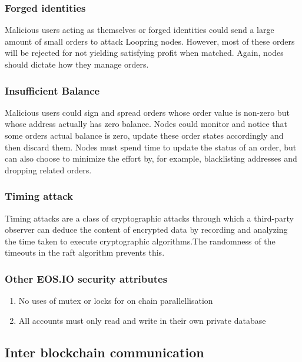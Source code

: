 \documentclass[]{article}
\begin{document}
		
		\subsubsection{Forged identities}
		Malicious users acting as themselves or forged identities 
		could send a large amount of small orders to attack Loopring
		nodes. However, most of these orders will be rejected 
		for not yielding satisfying profit when matched. 
		Again, nodes should dictate how they manage orders.
		
		\subsubsection{Insufficient Balance}
		Malicious users could sign and spread orders whose order 
		value is non-zero but whose address actually has zero 
		balance. Nodes could monitor and notice that some orders 
		actual balance is zero, update these order states accordingly
		and then discard them. Nodes must spend time to update
		the status of an order, but can also choose to minimize the
		effort by, for example, blacklisting addresses and dropping
		related orders.
		
		\subsubsection{Timing attack}
		 Timing attacks are a class of cryptographic attacks through which a third-party observer can deduce the content of encrypted data by recording and analyzing the time taken to execute cryptographic algorithms.The randomness of the timeouts in the raft algorithm prevents this.
		
		\subsubsection{Other EOS.IO security attributes}
		\begin{enumerate}
		\item No uses of mutex or locks for on chain parallellisation
		\item All accounts must only read and write in their own private database
		\end{enumerate}
		
	\subsection{Inter blockchain communication}
	
\end{document}
